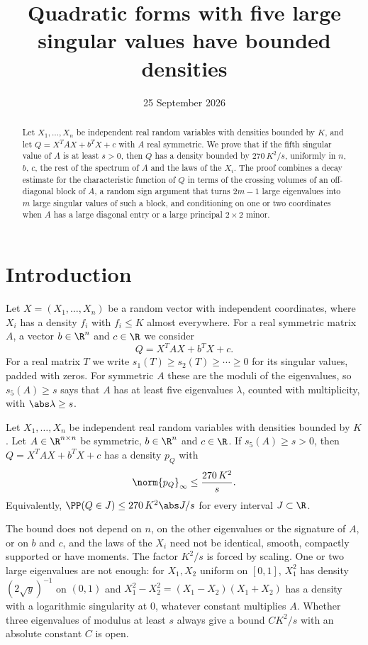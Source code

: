 \title{Quadratic forms with five large singular values have bounded densities}
\date{25 September 2026}



\begin{abstract}
Let $X_1,\dots,X_n$ be independent real random variables with densities bounded by $K$, and let $Q=X^{T}AX+b^{T}X+c$ with $A$ real symmetric. We prove that if the fifth singular value of $A$ is at least $s>0$, then $Q$ has a density bounded by $270\,K^2/s$, uniformly in $n$, $b$, $c$, the rest of the spectrum of $A$ and the laws of the $X_i$. The proof combines a decay estimate for the characteristic function of $Q$ in terms of the crossing volumes of an off-diagonal block of $A$, a random sign argument that turns $2m-1$ large eigenvalues into $m$ large singular values of such a block, and conditioning on one or two coordinates when $A$ has a large diagonal entry or a large principal $2\times2$ minor.
\end{abstract}

\maketitle

\section{Introduction}\label{sec:intro}

Let $X=(X_1,\dots,X_n)$ be a random vector with independent coordinates, where $X_i$ has a density $f_i$ with $f_i\le K$ almost everywhere. For a real symmetric matrix $A$, a vector $b\in\R^n$ and $c\in\R$ we consider
\[
Q=X^{T}AX+b^{T}X+c .
\]
For a real matrix $T$ we write $s_1(T)\ge s_2(T)\ge\cdots\ge0$ for its singular values, padded with zeros. For symmetric $A$ these are the moduli of the eigenvalues, so $s_5(A)\ge s$ says that $A$ has at least five eigenvalues $\lambda$, counted with multiplicity, with $\abs\lambda\ge s$.

\begin{theorem}\label{thm:main}
Let $X_1,\dots,X_n$ be independent real random variables with densities bounded by $K$. Let $A\in\R^{n\times n}$ be symmetric, $b\in\R^n$ and $c\in\R$. If $s_5(A)\ge s>0$, then $Q=X^TAX+b^TX+c$ has a density $p_Q$ with
\[
\norm{p_Q}_\infty\le \frac{270\,K^2}{s}.
\]
Equivalently, $\PP(Q\in J)\le 270\,K^2\abs J/s$ for every interval $J\subset\R$.
\end{theorem}

The bound does not depend on $n$, on the other eigenvalues or the signature of $A$, or on $b$ and $c$, and the laws of the $X_i$ need not be identical, smooth, compactly supported or have moments. The factor $K^2/s$ is forced by scaling. One or two large eigenvalues are not enough: for $X_1,X_2$ uniform on $[0,1]$, $X_1^2$ has density $(2\sqrt y)^{-1}$ on $(0,1)$ and $X_1^2-X_2^2=(X_1-X_2)(X_1+X_2)$ has a density with a logarithmic singularity at $0$, whatever constant multiplies $A$. Whether three eigenvalues of modulus at least $s$ always give a bound $CK^2/s$ with an absolute constant $C$ is open.

